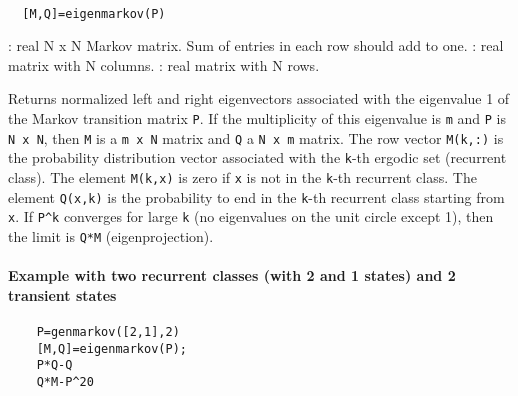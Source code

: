 \begin{mandesc}
   \\ %
\end{mandesc}
\begin{calling_sequence}
\begin{verbatim}
  [M,Q]=eigenmarkov(P)  
\end{verbatim}
\end{calling_sequence}
\begin{parameters}
  \begin{varlist}
    : real N x N Markov matrix. Sum of entries in each row should add to one.
    : real matrix with N columns.
    : real matrix with N rows.
  \end{varlist}
\end{parameters}
\begin{mandescription}
  Returns normalized left and right eigenvectors
  associated with the eigenvalue 1 of the Markov transition matrix \verb!P!.
  If the multiplicity of this eigenvalue is \verb!m! and \verb!P!
  is \verb!N x N!, then \verb!M! is a \verb!m x N! matrix and \verb!Q! a \verb!N x m! matrix.
  The row vector \verb!M(k,:)! is the probability distribution vector associated with the \verb!k!-th
  ergodic set (recurrent class). The element \verb!M(k,x)! is zero if \verb!x! is not in the
  \verb!k!-th recurrent class.
  The element \verb!Q(x,k)! is the probability to end in the \verb!k!-th recurrent class starting
  from \verb!x!. If \verb!P^k! converges for large \verb!k! (no eigenvalues on the
  unit circle except 1), then the limit is \verb!Q*M! (eigenprojection).
\end{mandescription}
\begin{examples}
  \paragraph{Example with two recurrent classes (with 2 and 1 states) and 2 transient states}
  \begin{Verbatim}
    P=genmarkov([2,1],2) 
    [M,Q]=eigenmarkov(P);
    P*Q-Q
    Q*M-P^20
  \end{Verbatim}
\end{examples}
\begin{manseealso}
     
\end{manseealso}


